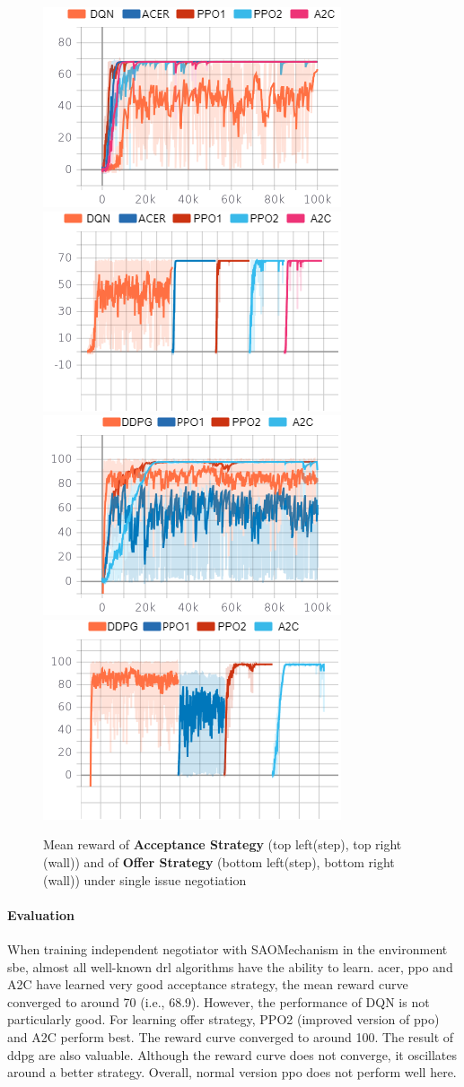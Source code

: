 \begin{figure}
    \includegraphics[width=.44\textwidth]{./images/ac_s.png}\hfill
    \includegraphics[width=.44\textwidth]{./images/ac_s_wall.png}
    \\[\smallskipamount]
    \includegraphics[width=.44\textwidth]{./images/of_s.png}\hfill
    \includegraphics[width=.44\textwidth]{./images/of_s_wall.png}
    \caption{Mean reward of \textbf{Acceptance Strategy} (top left(step), top right (wall)) and of \textbf{Offer Strategy} (bottom left(step), bottom right (wall)) under single issue negotiation}
		\label{fig:single-issue}
\end{figure}

\paragraph{Evaluation} When training independent negotiator with SAOMechanism in the environment \gls{sbe}, almost all well-known \gls{drl} algorithms have the ability to learn. \gls{acer}, \gls{ppo} and A2C have learned very good acceptance strategy, the mean reward curve converged to around 70 (i.e., 68.9). However, the performance of DQN is not particularly good. For learning offer strategy, PPO2 (improved version of \gls{ppo}) and A2C perform best. The reward curve converged to around 100. The result of \gls{ddpg} are also valuable. Although the reward curve does not converge, it oscillates around a better strategy. Overall, normal version \gls{ppo} does not perform well here. 


